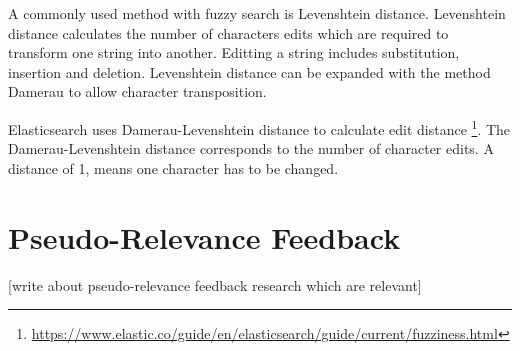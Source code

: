 A commonly used method with fuzzy search is Levenshtein distance.
Levenshtein distance calculates the number of characters edits which are required to transform one string into another.
Editting a string includes substitution, insertion and deletion.
Levenshtein distance can be expanded with the method Damerau to allow character transposition.

Elasticsearch uses Damerau-Levenshtein distance to calculate edit distance \footnote{\url{https://www.elastic.co/guide/en/elasticsearch/guide/current/fuzziness.html}}.
The Damerau-Levenshtein distance corresponds to the number of character edits.
A distance of 1, means one character has to be changed.

\section{Pseudo-Relevance Feedback}
[write about pseudo-relevance feedback research which are relevant]
\cite{pseudo-relevance-wikipedia}
